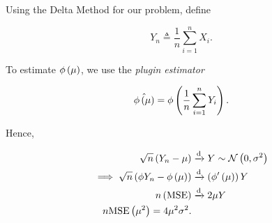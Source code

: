\documentclass[twoside]{article}
\begin{document}
Using the Delta Method for our problem, define

\begin{equation}
    Y_n \triangleq \frac{1}{n}\sum_{i=1}^nX_i.
    \label{eq:Yn-def}
\end{equation}

To estimate \(\phi\left(\mu\right)\), we use the \emph{plugin estimator}

\begin{equation}
    \hat{\phi\left(\mu\right)} = \phi\left(\frac{1}{n}\sum_{i=1}^nY_i\right).
    \label{eq:plugin-est-def}
\end{equation}

Hence,

\begin{align}
    \sqrt{n}\left(Y_n-\mu\right) &\xrightarrow{\mathrm{d}} Y \sim \mathcal N\left(0,\sigma^2\right) \\
    \implies \sqrt{n}\left(\phi{Y_n} - \phi\left(\mu\right)\right) &\xrightarrow{\mathrm{d}} \left(\phi^\prime\left(\mu\right)\right)Y \\
    n\left(\mathrm{MSE}\right) &\xrightarrow{\mathrm{d}} 2\mu Y \\
    n\mathrm{MSE}\left(\mu^2\right) = 4\mu^2\sigma^2.
    \label{eq:mse-muhat}
\end{align}
\end{document}

